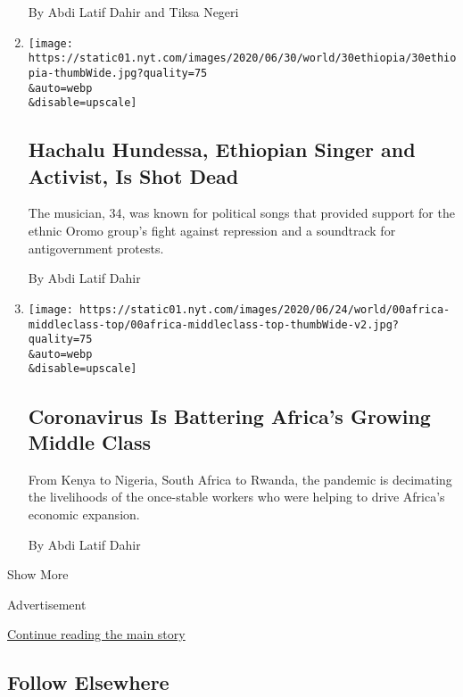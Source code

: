 \begin{enumerate}
  By Abdi Latif Dahir and Tiksa Negeri
\item
  \href{/2020/06/30/world/africa/ethiopia-hachalu-hundessa-dead.html}{}

  \texttt{[image: https://static01.nyt.com/images/2020/06/30/world/30ethiopia/30ethiopia-thumbWide.jpg?quality=75\\\&auto=webp\\\&disable=upscale]}

  \hypertarget{hachalu-hundessa-ethiopian-singer-and-activist-is-shot-dead}{%
  \subsection{Hachalu Hundessa, Ethiopian Singer and Activist, Is Shot
  Dead}\label{hachalu-hundessa-ethiopian-singer-and-activist-is-shot-dead}}

  The musician, 34, was known for political songs that provided support
  for the ethnic Oromo group's fight against repression and a soundtrack
  for antigovernment protests.

  By Abdi Latif Dahir
\item
  \href{/2020/06/29/world/africa/Africa-middle-class-coronavirus.html}{}

  \texttt{[image: https://static01.nyt.com/images/2020/06/24/world/00africa-middleclass-top/00africa-middleclass-top-thumbWide-v2.jpg?quality=75\\\&auto=webp\\\&disable=upscale]}

  \hypertarget{coronavirus-is-battering-africas-growing-middle-class}{%
  \subsection{Coronavirus Is Battering Africa's Growing Middle
  Class}\label{coronavirus-is-battering-africas-growing-middle-class}}

  From Kenya to Nigeria, South Africa to Rwanda, the pandemic is
  decimating the livelihoods of the once-stable workers who were helping
  to drive Africa's economic expansion.

  By Abdi Latif Dahir
\end{enumerate}

Show More

Advertisement

\protect\hyperlink{after-mid2}{Continue reading the main story}

\hypertarget{follow-elsewhere}{%
\subsection{Follow Elsewhere}\label{follow-elsewhere}}

